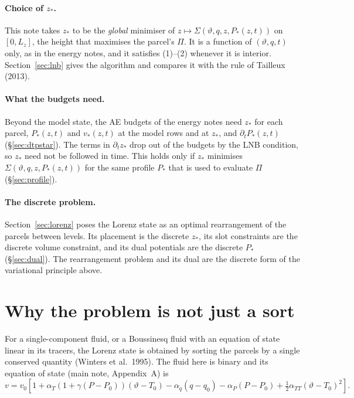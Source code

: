 \documentclass[11pt,a4paper]{article}
\newcommand{\vt}{\vartheta}
\newcommand{\zs}{z_{*}}
\begin{document}
\paragraph{Choice of $\zs$.} This note takes $\zs$ to be the \emph{global} minimiser of $z\mapsto\Sigma(\vt,q,z,P_*(z,t))$
on $[0,L_z]$, the height that maximises the parcel's $\Pi$. It is a function of $(\vt,q,t)$ only, as in the energy notes, and it
satisfies (1)--(2) whenever it is interior. Section~\ref{sec:lnb} gives the algorithm and compares it with the rule of
Tailleux (2013).

\paragraph{What the budgets need.} Beyond the model state, the AE budgets of the energy notes need $\zs$ for each parcel,
$P_*(z,t)$ and $v_*(z,t)$ at the model rows and at $\zs$, and $\partial_tP_*(z,t)$ (\S\ref{sec:dtpstar}). The terms in
$\partial_t\zs$ drop out of the budgets by the LNB condition, so $\zs$ need not be followed in time. This holds only if $\zs$
minimises $\Sigma(\vt,q,z,P_*(z,t))$ for the same profile $P_*$ that is used to evaluate $\Pi$ (\S\ref{sec:profile}).

\paragraph{The discrete problem.} Section~\ref{sec:lorenz} poses the Lorenz state as an optimal rearrangement of the parcels between levels. Its placement is
the discrete $\zs$, its slot constraints are the discrete volume constraint, and its dual potentials are the discrete $P_*$
(\S\ref{sec:dual}). The rearrangement problem and its dual are the discrete form of the variational principle above.

\section{Why the problem is not just a sort}\label{sec:why}
For a single-component fluid, or a Boussinesq fluid with an equation of state linear in its tracers, the Lorenz state is
obtained by sorting the parcels by a single conserved quantity (Winters et al.\ 1995). The fluid here is binary and its
equation of state (main note, Appendix~A) is
\begin{equation}
  v = v_0\left[1+\alpha_T\left(1+\gamma(P-P_0)\right)(\vt-T_0)-\alpha_q(q-q_0)-\alpha_P(P-P_0)+\tfrac12\alpha_{TT}(\vt-T_0)^2\right].
  \label{eq:eos}
\end{equation}
\end{document}

